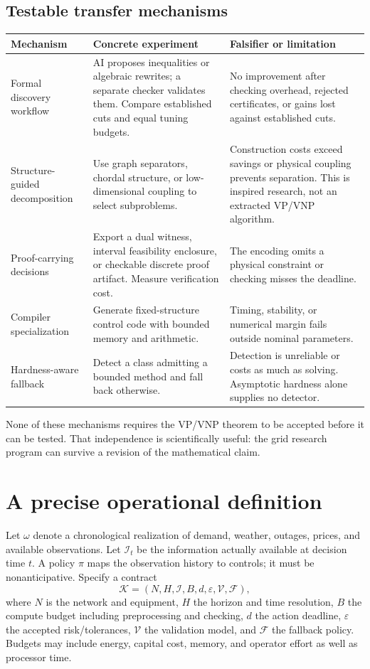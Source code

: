 \documentclass[11pt,letterpaper]{article}
\begin{document}
\subsection{Testable transfer mechanisms}
\begin{longtable}{P{.19\linewidth}P{.37\linewidth}P{.35\linewidth}}
\toprule Mechanism & Concrete experiment & Falsifier or limitation\\\midrule\endhead
Formal discovery workflow & AI proposes inequalities or algebraic rewrites; a separate checker validates them. Compare established cuts and equal tuning budgets. & No improvement after checking overhead, rejected certificates, or gains lost against established cuts.\\
Structure-guided decomposition & Use graph separators, chordal structure, or low-dimensional coupling to select subproblems. & Construction costs exceed savings or physical coupling prevents separation. This is inspired research, not an extracted VP/VNP algorithm.\\
Proof-carrying decisions & Export a dual witness, interval feasibility enclosure, or checkable discrete proof artifact. Measure verification cost. & The encoding omits a physical constraint or checking misses the deadline.\\
Compiler specialization & Generate fixed-structure control code with bounded memory and arithmetic. & Timing, stability, or numerical margin fails outside nominal parameters.\\
Hardness-aware fallback & Detect a class admitting a bounded method and fall back otherwise. & Detection is unreliable or costs as much as solving. Asymptotic hardness alone supplies no detector.\\
\bottomrule
\end{longtable}
None of these mechanisms requires the VP/VNP theorem to be accepted before it can be tested. That independence is scientifically useful: the grid research program can survive a revision of the mathematical claim.

\section{A precise operational definition}
\label{sec:definition}
Let $\omega$ denote a chronological realization of demand, weather, outages, prices, and available observations. Let $\mathcal I_t$ be the information actually available at decision time $t$. A policy $\pi$ maps the observation history to controls; it must be nonanticipative. Specify a contract
\[
 \mathcal K=(N,H,\mathcal I,B,d,\varepsilon,\mathcal V,\mathcal F),
\]
where $N$ is the network and equipment, $H$ the horizon and time resolution, $B$ the compute budget including preprocessing and checking, $d$ the action deadline, $\varepsilon$ the accepted risk/tolerances, $\mathcal V$ the validation model, and $\mathcal F$ the fallback policy. Budgets may include energy, capital cost, memory, and operator effort as well as processor time.
\end{document}
